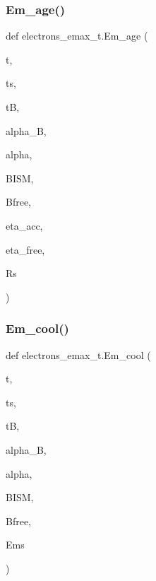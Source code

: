 \subsubsection{\texorpdfstring{Em\+\_\+age()}{Em\_age()}}
{\footnotesize\ttfamily def electrons\+\_\+emax\+\_\+t.\+Em\+\_\+age (\begin{DoxyParamCaption}\item[{}]{t,  }\item[{}]{ts,  }\item[{}]{tB,  }\item[{}]{alpha\+\_\+B,  }\item[{}]{alpha,  }\item[{}]{B\+I\+SM,  }\item[{}]{Bfree,  }\item[{}]{eta\+\_\+acc,  }\item[{}]{eta\+\_\+free,  }\item[{}]{Rs }\end{DoxyParamCaption})}

\mbox{\label{namespaceelectrons__emax__t_ae898717ff3e5f717736fd77dd7ced7b4}} 
\subsubsection{\texorpdfstring{Em\+\_\+cool()}{Em\_cool()}}
{\footnotesize\ttfamily def electrons\+\_\+emax\+\_\+t.\+Em\+\_\+cool (\begin{DoxyParamCaption}\item[{}]{t,  }\item[{}]{ts,  }\item[{}]{tB,  }\item[{}]{alpha\+\_\+B,  }\item[{}]{alpha,  }\item[{}]{B\+I\+SM,  }\item[{}]{Bfree,  }\item[{}]{Ems }\end{DoxyParamCaption})}

\mbox{\label{namespaceelectrons__emax__t_a369f38813e74f5ba6f617bcf0ab7c43a}} 
